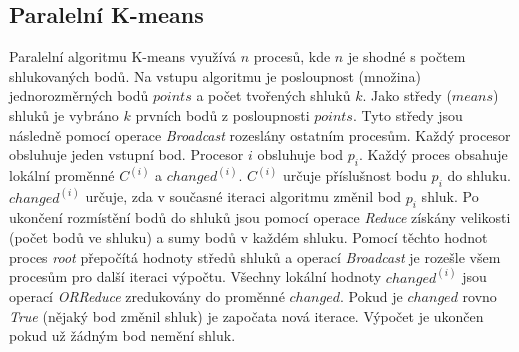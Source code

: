 \documentclass[a4paper, 11pt, fleqn]{scrartcl}
\begin{document}


    \subsection{Paralelní K-means}

      Paralelní algoritmu K-means využívá $n$ procesů, kde $n$ je shodné s počtem shlukovaných bodů. Na vstupu algoritmu je posloupnost (množina) jednorozměrných bodů $points$ a počet tvořených shluků $k$. Jako středy ($means$) shluků je vybráno $k$ prvních bodů z posloupnosti $points$. Tyto středy jsou následně pomocí operace \textit{Broadcast} rozeslány ostatním procesům. Každý procesor obsluhuje jeden vstupní bod. Procesor $i$ obsluhuje bod $p_i$. Každý proces obsahuje lokální proměnné $C^{(i)}$ a $changed^{(i)}$. $C^{(i)}$ určuje příslušnost bodu $p_i$ do shluku. $changed^{(i)}$ určuje, zda v současné iteraci algoritmu změnil bod $p_i$ shluk. Po ukončení rozmístění bodů do shluků jsou pomocí operace \textit{Reduce} získány velikosti (počet bodů ve shluku) a sumy bodů v každém shluku. Pomocí těchto hodnot proces \textit{root} přepočítá hodnoty středů shluků a operací \textit{Broadcast} je rozešle všem procesům pro další iteraci výpočtu. Všechny lokální hodnoty $changed^{(i)}$ jsou operací \textit{ORReduce} zredukovány do proměnné $changed$. Pokud je $changed$ rovno \textit{True} (nějaký bod změnil shluk) je započata nová iterace. Výpočet  je ukončen pokud už žádným bod nemění shluk.
\end{document}

